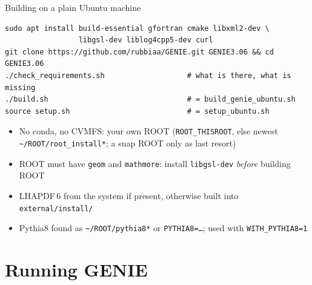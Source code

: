 \documentclass[10pt,aspectratio=169]{beamer}
\newcommand{\code}[1]{\texttt{\small #1}}
\begin{document}
\begin{frame}[fragile]{Building on a plain Ubuntu machine}
\begin{lstlisting}
sudo apt install build-essential gfortran cmake libxml2-dev \
                 libgsl-dev liblog4cpp5-dev curl
git clone https://github.com/rubbiaa/GENIE.git GENIE3.06 && cd GENIE3.06
./check_requirements.sh                   # what is there, what is missing
./build.sh                                # = build_genie_ubuntu.sh
source setup.sh                           # = setup_ubuntu.sh
\end{lstlisting}
  \vspace{0.5em}
  \begin{itemize}\small
    \item No conda, no CVMFS: your own ROOT (\code{ROOT\_THISROOT}, else newest
          \code{\textasciitilde/ROOT/root\_install*}; a snap ROOT only as last resort)
    \item ROOT must have \code{geom} and \code{mathmore}: install \code{libgsl-dev} \emph{before} building ROOT
    \item LHAPDF\,6 from the system if present, otherwise built into \code{external/install/}
    \item Pythia8 found as \code{\textasciitilde/ROOT/pythia8*} or \code{PYTHIA8=\dots}; used with \code{WITH\_PYTHIA8=1}
  \end{itemize}
\end{frame}

\section{Running GENIE}
\end{document}
